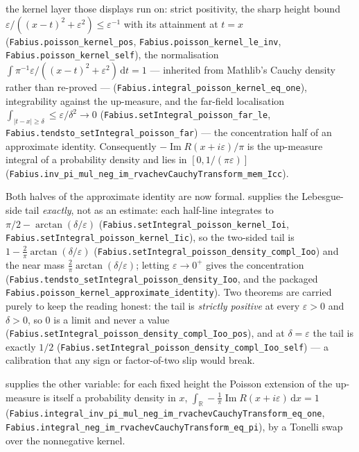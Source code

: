 \documentclass[11pt,oneside]{article}
\theoremstyle{definition}
\theoremstyle{remark}
\newcommand{\R}{\mathbb R}
\newcommand{\dd}{\,\mathrm d}
\newcommand{\1}{\mathbf 1}
\DeclareMathOperator{\Ima}{Im}
\begin{document}
\begin{statusbox}
the kernel layer those displays run on: strict positivity, the sharp height bound
\(\varepsilon/((x-t)^2+\varepsilon^2)\le\varepsilon^{-1}\) with its attainment at \(t=x\)
(\nolinkurl{Fabius.poisson\_kernel\_pos}, \nolinkurl{Fabius.poisson\_kernel\_le\_inv},
\nolinkurl{Fabius.poisson\_kernel\_self}), the normalisation \(\int\pi^{-1}\varepsilon/((x-t)^2+\varepsilon^2)\dd t=1\) ---
inherited from Mathlib's Cauchy density rather than re-proved ---
(\nolinkurl{Fabius.integral\_poisson\_kernel\_eq\_one}), integrability against the up-measure,
and the far-field localisation \(\int_{\lvert t-x\rvert\ge\delta}\le\varepsilon/\delta^2\to0\)
(\nolinkurl{Fabius.setIntegral\_poisson\_far\_le}, \nolinkurl{Fabius.tendsto\_setIntegral\_poisson\_far}) ---
the concentration half of an approximate identity.  Consequently \(-\Ima R(x+i\varepsilon)/\pi\)
is the up-measure integral of a probability density and lies in \([0,1/(\pi\varepsilon)]\)
(\nolinkurl{Fabius.inv\_pi\_mul\_neg\_im\_rvachevCauchyTransform\_mem\_Icc}).

Both halves of the approximate identity are now formal.  
supplies the Lebesgue-side tail \emph{exactly}, not as an estimate: each half-line integrates
to \(\pi/2-\arctan(\delta/\varepsilon)\)
(\nolinkurl{Fabius.setIntegral\_poisson\_kernel\_Ioi}, \nolinkurl{Fabius.setIntegral\_poisson\_kernel\_Iic}),
so the two-sided tail is \(1-\tfrac{2}{\pi}\arctan(\delta/\varepsilon)\)
(\nolinkurl{Fabius.setIntegral\_poisson\_density\_compl\_Ioo}) and the near mass
\(\tfrac{2}{\pi}\arctan(\delta/\varepsilon)\); letting \(\varepsilon\to0^{+}\) gives the concentration
(\nolinkurl{Fabius.tendsto\_setIntegral\_poisson\_density\_Ioo}, and the packaged
\nolinkurl{Fabius.poisson\_kernel\_approximate\_identity}).  Two theorems are carried purely to
keep the reading honest: the tail is \emph{strictly positive} at every \(\varepsilon>0\) and
\(\delta>0\), so \(0\) is a limit and never a value
(\nolinkurl{Fabius.setIntegral\_poisson\_density\_compl\_Ioo\_pos}), and at \(\delta=\varepsilon\) the
tail is exactly \(1/2\) (\nolinkurl{Fabius.setIntegral\_poisson\_density\_compl\_Ioo\_self}) --- a
calibration that any sign or factor-of-two slip would break.

 supplies the other variable: for each fixed height the Poisson
extension of the up-measure is itself a probability density in \(x\),
\(\int_{\R}-\tfrac1\pi\Ima R(x+i\varepsilon)\dd x=1\)
(\nolinkurl{Fabius.integral\_inv\_pi\_mul\_neg\_im\_rvachevCauchyTransform\_eq\_one},
\nolinkurl{Fabius.integral\_neg\_im\_rvachevCauchyTransform\_eq\_pi}), by a Tonelli swap over
the nonnegative kernel.


\end{statusbox}
\end{document}
